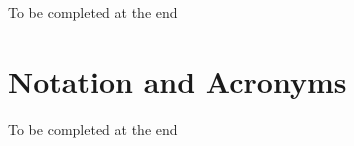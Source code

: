 \documentclass[ %
                    author={James Stephenson},
                supervisor={Dr. Edwin Simpson},
                    degree={MSc},
                     title={Bayesian Deep Learning For Extractive Test Summarisation},
                  subtitle={},
                      type={},
                      year={2023}]{../additions/dissertation}
\begin{document}
		To be completed at the end
		
		
	
	\chapter*{Notation and Acronyms}
	
		To be completed at the end
		
\end{document}
